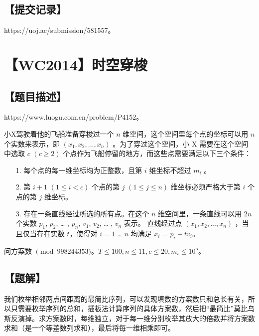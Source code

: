 \documentclass[UTF8,12pt,a4paper]{ctexart}
\begin{document}
	\subsection*{【提交记录】}
	
	https://uoj.ac/submission/581557。
	
	
	\section*{【WC2014】时空穿梭}
	
	\subsection*{【题目描述】}
	
	https://www.luogu.com.cn/problem/P4152。
	
	小X驾驶着他的飞船准备穿梭过一个 $n$ 维空间，这个空间里每个点的坐标可以用 $n$ 个实数来表示，即 $(x_1, x_2, ... , x_n)$ 。为了穿过这个空间，小 X 需要在这个空间中选取 $c$ $(c \geq 2)$ 个点作为飞船停留的地方，而这些点需要满足以下三个条件：
	
	\begin{itemize}
		\item[1.] 每个点的每一维坐标均为正整数，且第 $i$ 维坐标不超过 $m_i$ 。
		\item[2.] 第 $i + 1$ $(1 \leq i < c)$ 个点的第 $j$ $(1 \leq j \leq n)$ 维坐标必须严格大于第 $i$ 个点的第 $j$ 维坐标。
		\item [3.] 存在一条直线经过所选的所有点。在这个 $n$ 维空间里，一条直线可以用 $2n$个实数 $p_1$, $p_2$, … , $p_n$, $v_1$, $v_2$, … , $v_n$ 表示。 直线经过点 $(x_1, x_2, ... , x_n)$ ，当且仅当存在实数 $t$，使得对 $i = 1$ … $n$ 均满足 $x_i$ = $p_i + tv_i$。
	\end{itemize}
	
	问方案数 $\pmod{998244353}$。$T\le 100,n\le 11,c\le 20,m_i\le 10^5$。	
	
	\subsection*{【题解】}
	
	我们枚举相邻两点间距离的最简比序列，可以发现填数的方案数只和总长有关，所以只需要枚举序列的总和，插板法计算序列的具体方案数，然后把“最简比”莫比乌斯反演掉。求方案数时，每维独立，对于每一维分别枚举其放大的倍数并将方案数求和（是一个等差数列求和），最后将每一维相乘即可。
	
\end{document}
